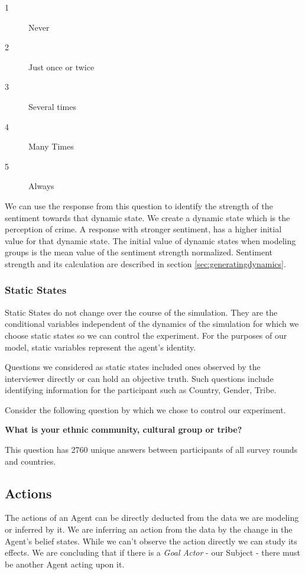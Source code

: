 {

\begin{description}
	\item [1] Never
	\item [2] Just once or twice
	\item [3] Several times
	\item [4] Many Times
	\item [5] Always
\end{description} 

We can use the response from this question to identify the strength of the sentiment towards that dynamic state. We create a dynamic state which is the perception of crime. A response with stronger sentiment, has a higher initial value for that dynamic state. The initial value of dynamic states when modeling groups is the mean value of the sentiment strength normalized. Sentiment strength and its calculation are described in section \ref{sec:generatingdynamics}.

\subsubsection{Static States}
Static States do not change over the course of the simulation. They are the conditional variables independent of the dynamics of the simulation for which we choose static states so we can control the experiment. For the purposes of our model, static variables represent the agent's identity. 

Questions we considered as static states included ones observed by the interviewer directly or can hold an objective truth. Such questions include identifying information for the participant such as Country, Gender, Tribe. 

Consider the following question by which we chose to control our experiment.

\textbf{What is your ethnic community, cultural group or tribe?}

This question has 2760 unique answers between participants of all survey rounds and countries. 

\subsection{Actions}



The actions of an Agent can be directly deducted from the data we are modeling or inferred by it. We are inferring an action from the data by the change in the Agent's belief states. While we can't observe the action directly we can study its effects. We are concluding that if there is a \textit{Goal Actor} - our Subject - there must be another Agent acting upon it. 

}
